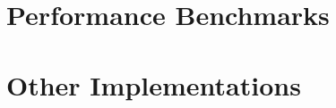 \documentclass[12pt, titlepage]{article}
\begin{document}
\newpage
\setcounter{page}{3}
\tableofcontents
\newpage





\section{Performance Benchmarks}








\section{Other Implementations}







\newpage
\printbibliography
\end{document}
